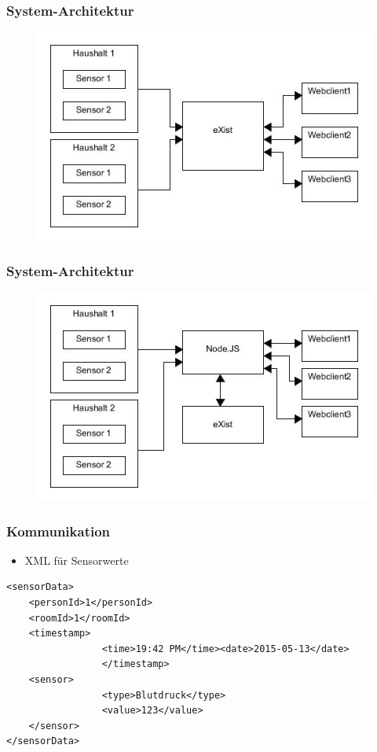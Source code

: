 \documentclass{beamer}
\begin{document}
\begin{frame}
\frametitle{System-Architektur}
\begin{figure}[H]
\begin{center}
\includegraphics[scale=0.5]{images/sa1.jpg} 
\end{center}
\end{figure}
\end{frame}

\begin{frame}
\frametitle{System-Architektur}
\begin{figure}[H]
\begin{center}
\includegraphics[scale=0.5]{images/sa2.jpg} 
\end{center}
\end{figure}
\end{frame}


\begin{frame}[fragile]
\frametitle{Kommunikation}
\begin{itemize}
	\item XML für Sensorwerte
\end{itemize}
\begin{lstlisting}
<sensorData>
    <personId>1</personId>
    <roomId>1</roomId>
    <timestamp>
		         <time>19:42 PM</time><date>2015-05-13</date>
		         </timestamp>
    <sensor>
		         <type>Blutdruck</type>
		         <value>123</value>
    </sensor>
</sensorData>
\end{lstlisting}
\end{frame}
\end{document}
